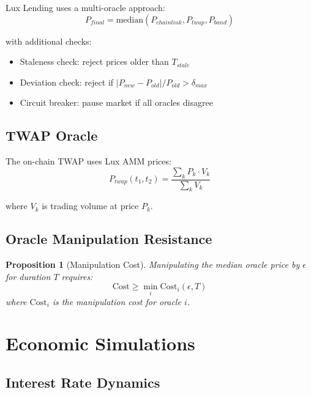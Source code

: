 \documentclass[11pt,a4paper]{article}
\newtheorem{proposition}[theorem]{Proposition}
\begin{document}
Lux Lending uses a multi-oracle approach:
\begin{equation}
    P_{final} = \text{median}(P_{chainlink}, P_{twap}, P_{band})
\end{equation}

with additional checks:
\begin{itemize}
    \item Staleness check: reject prices older than $T_{stale}$
    \item Deviation check: reject if $|P_{new} - P_{old}|/P_{old} > \delta_{max}$
    \item Circuit breaker: pause market if all oracles disagree
\end{itemize}

\subsection{TWAP Oracle}

The on-chain TWAP uses Lux AMM prices:
\begin{equation}
    P_{twap}(t_1, t_2) = \frac{\sum_{k} P_k \cdot V_k}{\sum_k V_k}
\end{equation}

where $V_k$ is trading volume at price $P_k$.

\subsection{Oracle Manipulation Resistance}

\begin{proposition}[Manipulation Cost]
Manipulating the median oracle price by $\epsilon$ for duration $T$ requires:
\begin{equation}
    \text{Cost} \geq \min_i \text{Cost}_i(\epsilon, T)
\end{equation}
where $\text{Cost}_i$ is the manipulation cost for oracle $i$.
\end{proposition}

\section{Economic Simulations}

\subsection{Interest Rate Dynamics}
\end{document}
